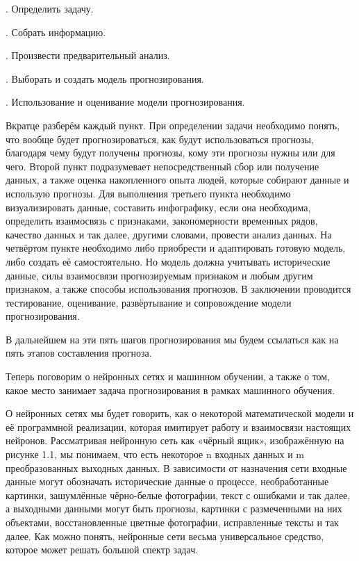 {  \par {}. Определить задачу. 
  \par {}. Собрать информацию. 
  \par {}. Произвести предварительный анализ.
  \par {}. Выборать и создать модель прогнозирования.
  \par {}. Использование и оценивание модели прогнозирования. 

  \par \redline Вкратце разберём каждый пункт. При определении задачи необходимо понять, что вообще будет прогнозироваться, как будут использоваться прогнозы, благодаря чему будут получены прогнозы, кому эти прогнозы нужны или для чего. Второй пункт подразумевает непосредственный сбор или получение данных, а также оценка накопленного опыта людей, которые собирают данные и использую прогнозы. Для выполнения третьего пункта необходимо визуализировать данные, составить инфографику, если она необходима, определить взаимосвязь с признаками, закономерности временных рядов, качество данных и так далее, другими словами, провести анализ данных. На четвёртом пункте необходимо либо приобрести и адаптировать готовую модель, либо создать её самостоятельно. Но модель должна учитывать исторические данные, силы взаимосвязи прогнозируемым признаком и любым другим признаком, а также способы использования прогнозов. В заключении проводится тестирование, оценивание, развёртывание и сопровождение модели прогнозирования. 

  \par \redline В дальнейшем на эти пять шагов прогнозирования мы будем ссылаться как на пять этапов составления прогноза.

  \par \redline Теперь поговорим о нейронных сетях и машинном обучении, а также о том, какое место занимает задача прогнозирования в рамках машинного обучения. 

  \par \redline О нейронных сетях мы будет говорить, как о некоторой математической модели и её программной реализации, которая имитирует работу и взаимосвязи настоящих нейронов.  Рассматривая нейронную сеть как «чёрный ящик», изображённую на рисунке 1.1, мы понимаем, что есть некоторое n входных данных и m преобразованных выходных данных. В зависимости от назначения сети входные данные могут обозначать исторические данные о процессе, необработанные картинки, зашумлённые чёрно-белые фотографии, текст с ошибками и так далее, а выходными данными могут быть прогнозы, картинки с размеченными на них объектами, восстановленные цветные фотографии, исправленные тексты и так далее. Как можно понять, нейронные сети весьма универсальное средство, которое может решать большой спектр задач. 

}
